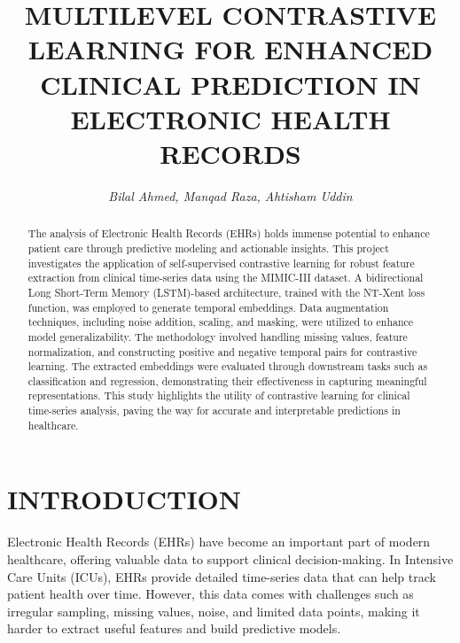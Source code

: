 \documentclass[twocolumn]{article}
\begin{document}
    \title{\large \textbf{MULTILEVEL CONTRASTIVE LEARNING FOR ENHANCED CLINICAL
    PREDICTION IN ELECTRONIC HEALTH RECORDS}}

    \author{\textit{Bilal Ahmed, Manqad Raza, Ahtisham Uddin}}

    \maketitle

    \begin{abstract}
        The analysis of Electronic Health Records (EHRs) holds immense potential
        to enhance patient care through predictive modeling and actionable insights.
        This project investigates the application of self-supervised contrastive
        learning for robust feature extraction from clinical time-series data
        using the MIMIC-III dataset. A bidirectional Long Short-Term Memory (LSTM)-based
        architecture, trained with the NT-Xent loss function, was employed to generate
        temporal embeddings. Data augmentation techniques, including noise addition,
        scaling, and masking, were utilized to enhance model generalizability. The
        methodology involved handling missing values, feature normalization, and
        constructing positive and negative temporal pairs for contrastive learning.
        The extracted embeddings were evaluated through downstream tasks such as
        classification and regression, demonstrating their effectiveness in capturing
        meaningful representations. This study highlights the utility of
        contrastive learning for clinical time-series analysis, paving the way for
        accurate and interpretable predictions in healthcare.
    \end{abstract}

    \section{\large INTRODUCTION}

    Electronic Health Records (EHRs) have become an important part of modern healthcare,
    offering valuable data to support clinical decision-making. In Intensive Care
    Units (ICUs), EHRs provide detailed time-series data that can help track
    patient health over time. However, this data comes with challenges such as
    irregular sampling, missing values, noise, and limited data points, making
    it harder to extract useful features and build predictive models.
\end{document}
